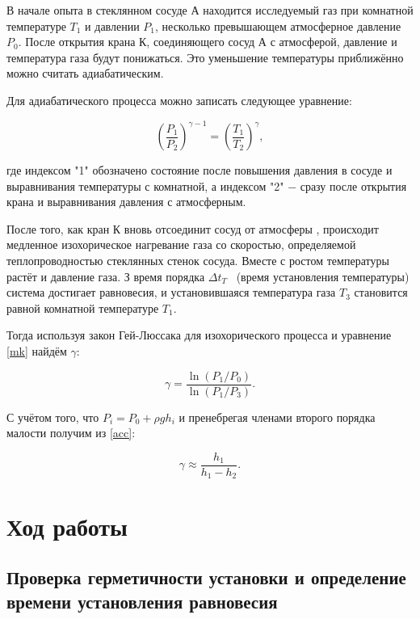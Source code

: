\documentclass[a4paper, 12pt]{article}
\begin{document}
		В начале опыта  в стеклянном сосуде А находится исследуемый газ при комнатной температуре $T_1$ и давлении $P_1$, несколько превышающем атмосферное давление  $P_0$. После открытия крана К, соединяющего сосуд А с атмосферой, давление и температура газа будут понижаться. Это уменьшение температуры приближённо можно считать адиабатическим.

		Для адиабатического процесса можно записать следующее уравнение:

		\begin{equation}\label{mk}
		\left(\dfrac{P_1}{P_2}\right)^{\gamma - 1} = \left(\dfrac{T_1}{T_2}\right)^\gamma ,
		\end{equation}

		где индексом "1" обозначено состояние после повышения давления в сосуде и выравнивания температуры с комнатной, а индексом "2"  $-$ сразу после открытия крана и выравнивания давления с атмосферным.

		После того, как кран К вновь отсоединит сосуд от атмосферы , происходит медленное изохорическое нагревание газа со скоростью, определяемой теплопроводностью стеклянных стенок сосуда. Вместе с ростом температуры растёт и давление газа. З время порядка $\Delta t_T$  (время установления температуры) система достигает равновесия, и установившаяся температура газа $T_3$ становится равной комнатной температуре $T_1$.

		Тогда используя закон Гей-Люссака для изохорического процесса и уравнение \eqref{mk} найдём $\gamma$:

		\begin{equation}\label{acc}
		\gamma = \dfrac{\ln(P_1 / P_0)}{\ln (P_1 / P_3)}.
		\end{equation}

		С учётом того, что $P_i = P_0 + \rho g h_i$ и пренебрегая членами второго порядка малости получим из \eqref{acc}:

		\begin{equation}\label{r}
		\gamma \approx \dfrac{h_1}{h_1 - h_2}.
		\end{equation}

	\section{Ход работы}

		\subsection{Проверка герметичности установки и определение времени установления равновесия}
\end{document}
